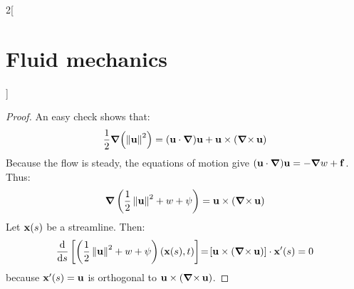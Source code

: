 \documentclass[../../../main_physics.tex]{subfiles}
\begin{document}
\begin{multicols}{2}[\section{Fluid mechanics}]
\begin{theorem}
  \end{theorem}
  \begin{proof}
    An easy check shows that:
    $$
      \frac{1}{2}\grad(\norm{\vf{u}}^2)=(\vf{u}\cdot\grad)\vf{u}+\vf{u}\times(\rotp\vf{u})
    $$
    Because the flow is steady, the equations of motion give $(\vf{u}\cdot\grad)\vf{u}=-\grad w+\vf{f}$. Thus:
    $$
      \grad\left(\frac{1}{2}\norm{\vf{u}}^2+w+\psi\right)=\vf{u}\times (\rotp\vf{u})
    $$
    Let $\vf{x}(s)$ be a streamline. Then:
    \begin{equation*}
      \dv{}{s}\left[\left(\frac{1}{2}\norm{\vf{u}}^2+w+\psi\right)(\vf{x}(s),t)\right]\! =\! [\vf{u}\times (\rotp\vf{u})]\cdot\vf{x}'(s)=0
    \end{equation*}
    because $\vf{x}'(s)=\vf{u}$ is orthogonal to $\vf{u}\times (\rotp\vf{u})$.
  \end{proof}

\end{multicols}
\end{document}
